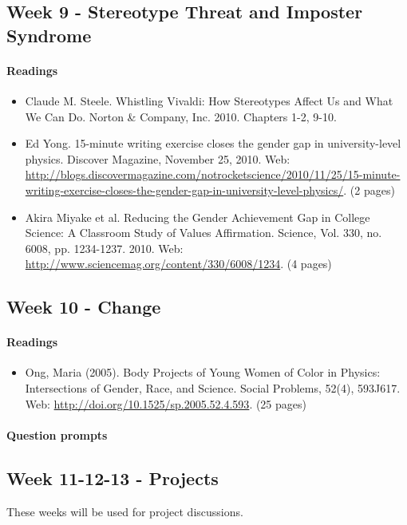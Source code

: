 \documentclass{article}
\begin{document}
\subsection{Week 9 - Stereotype Threat and Imposter Syndrome}
\paragraph{Readings}
\begin{itemize}
\item Claude M. Steele. Whistling Vivaldi: How Stereotypes Affect Us and What We Can Do. Norton \& Company, Inc. 2010. Chapters 1-2, 9-10.
\item Ed Yong. 15-minute writing exercise closes the gender gap in university-level physics. Discover Magazine, November 25, 2010. Web: \url{http://blogs.discovermagazine.com/notrocketscience/2010/11/25/15-minute-writing-exercise-closes-the-gender-gap-in-university-level-physics/}. (2 pages)
\item Akira Miyake et al. Reducing the Gender Achievement Gap in College Science: A Classroom Study of Values Affirmation. Science, Vol. 330, no. 6008, pp. 1234-1237. 2010. Web: \url{http://www.sciencemag.org/content/330/6008/1234}. (4 pages)
\end{itemize}


\subsection{Week 10 - Change}
\paragraph{Readings}
\begin{itemize}
\item Ong, Maria (2005). Body Projects of Young Women of Color in Physics: Intersections of Gender, Race, and Science. Social Problems, 52(4), 593J617. Web: \url{http://doi.org/10.1525/sp.2005.52.4.593}. (25 pages)
\end{itemize}
\paragraph{Question prompts}


\subsection{Week 11-12-13 - Projects}
These weeks will be used for project discussions.
\end{document}
